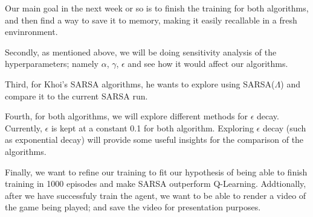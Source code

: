 \documentclass[nohyperref]{article}
\theoremstyle{plain}
\theoremstyle{definition}
\theoremstyle{remark}
\newcommand{\cnote}[1]{\textsf{\color{blue} [#1]}}
\begin{document}
Our main goal in the next week or so is to finish the training for both algorithms, and then find a way to save it to memory, making it easily recallable in a fresh envinronment.

Secondly, as mentioned above, we will be doing sensitivity analysis of the hyperparameters; namely $\alpha$, $\gamma$, $\epsilon$ and see how it would
affect our algorithms.

Third, for Khoi's SARSA algorithms, he wants to explore using SARSA($\Lambda$) and compare it to the current SARSA run. 

Fourth, for both algorithms, we will explore different methods for $\epsilon$ decay. Currently, $\epsilon$ is kept at a constant 0.1 for both algorithm.
Exploring $\epsilon$ decay (such as exponential decay) will provide some useful insights for the comparison of the algorithms.

Finally, we want to refine our training to fit our hypothesis of being able to finish training in 1000 episodes and make SARSA outperform Q-Learning.
Addtionally, after we have successfuly train the agent, we want to be able to render a video of the game being played; and save the video for presentation purposes.



\end{document}

